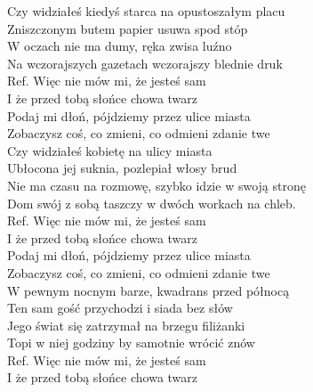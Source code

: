 
\begin{flushleft}
Czy widziałeś kiedyś starca na opustoszałym placu  \\
Zniszczonym butem papier usuwa spod stóp  \tab{} \\
W oczach nie ma dumy, ręka zwisa luźno  \tab{}  \\
Na wczorajszych gazetach wczorajszy blednie druk  \\
\vskip 3mm
Ref. Więc nie mów mi, że jesteś sam  \tab{} \\
\hspace{0.9cm}I że przed tobą słońce chowa twarz  \tab{} \\
\hspace{0.9cm}Podaj mi dłoń, pójdziemy przez ulice miasta   \\
\hspace{0.9cm}Zobaczysz coś, co zmieni, co odmieni zdanie twe \\
\vskip 3mm
Czy widziałeś kobietę na ulicy miasta \\
Ubłocona jej suknia, pozlepiał włosy brud \\
Nie ma czasu na rozmowę, szybko idzie w swoją stronę \\
Dom swój z sobą taszczy w dwóch workach na chleb. \\
\vskip 3mm
Ref. Więc nie mów mi, że jesteś sam\\
\hspace{0.9cm}I że przed tobą słońce chowa twarz \\
\hspace{0.9cm}Podaj mi dłoń, pójdziemy przez ulice miasta \\
\hspace{0.9cm}Zobaczysz coś, co zmieni, co odmieni zdanie twe \\
\vskip 3mm
W pewnym nocnym barze, kwadrans przed północą \\
Ten sam gość przychodzi i siada bez słów \\
Jego świat się zatrzymał na brzegu filiżanki \\
Topi w niej godziny by samotnie wrócić znów \\
\vskip 3mm
Ref. Więc nie mów mi, że jesteś sam\\
\hspace{0.9cm}I że przed tobą słońce chowa twarz \\

\end{flushleft}

